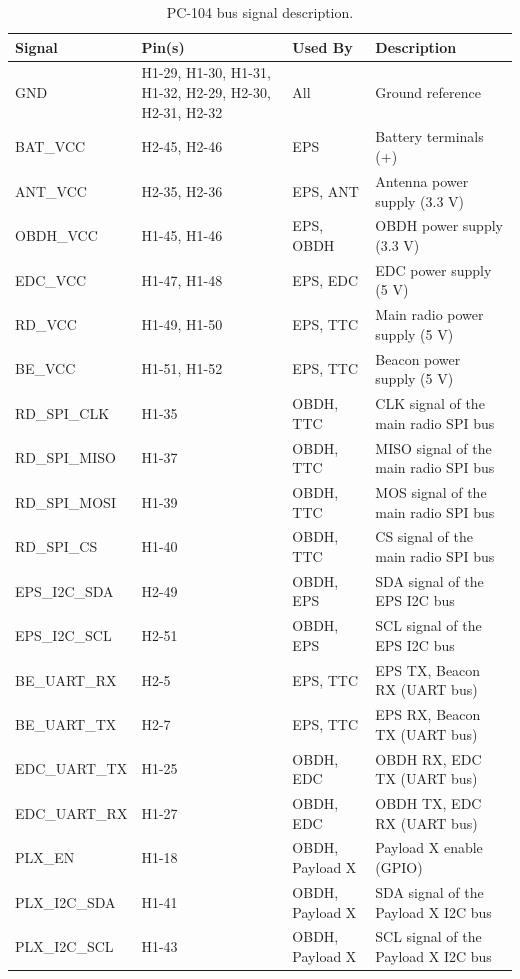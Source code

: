 \begin{table}[!h]
    \centering
    \begin{tabular}{lL{0.2\textwidth}L{0.15\textwidth}L{0.35\textwidth}}
        \toprule[1.5pt]
        \textbf{Signal} & \textbf{Pin(s)} & \textbf{Used By}     & \textbf{Description} \\
        \midrule
        GND             & H1-29, H1-30, H1-31, H1-32, H2-29, H2-30, H2-31, H2-32 & All                  & Ground reference \\
        BAT\_VCC        & H2-45, H2-46    & EPS                  & Battery terminals (+) \\
        ANT\_VCC        & H2-35, H2-36    & EPS, ANT             & Antenna power supply (3.3 V) \\
        OBDH\_VCC       & H1-45, H1-46    & EPS, OBDH            & OBDH power supply (3.3 V) \\
        EDC\_VCC        & H1-47, H1-48    & EPS, EDC             & EDC power supply (5 V) \\
        RD\_VCC         & H1-49, H1-50    & EPS, TTC             & Main radio power supply (5 V) \\
        BE\_VCC         & H1-51, H1-52    & EPS, TTC             & Beacon power supply (5 V) \\
        RD\_SPI\_CLK    & H1-35           & OBDH, TTC            & CLK signal of the main radio SPI bus \\
        RD\_SPI\_MISO   & H1-37           & OBDH, TTC            & MISO signal of the main radio SPI bus \\
        RD\_SPI\_MOSI   & H1-39           & OBDH, TTC            & MOS signal of the main radio SPI bus \\
        RD\_SPI\_CS     & H1-40           & OBDH, TTC            & CS signal of the main radio SPI bus \\
        EPS\_I2C\_SDA   & H2-49           & OBDH, EPS            & SDA signal of the EPS I2C bus \\
        EPS\_I2C\_SCL   & H2-51           & OBDH, EPS            & SCL signal of the EPS I2C bus \\
        BE\_UART\_RX    & H2-5            & EPS, TTC             & EPS TX, Beacon RX (UART bus) \\
        BE\_UART\_TX    & H2-7            & EPS, TTC             & EPS RX, Beacon TX (UART bus) \\
        EDC\_UART\_TX   & H1-25           & OBDH, EDC            & OBDH RX, EDC TX (UART bus) \\
        EDC\_UART\_RX   & H1-27           & OBDH, EDC            & OBDH TX, EDC RX (UART bus) \\
        PLX\_EN         & H1-18           & OBDH, Payload X      & Payload X enable (GPIO) \\
        PLX\_I2C\_SDA   & H1-41           & OBDH, Payload X      & SDA signal of the Payload X I2C bus \\
        PLX\_I2C\_SCL   & H1-43           & OBDH, Payload X      & SCL signal of the Payload X I2C bus \\
        \bottomrule[1.5pt]
    \end{tabular}
    \caption{PC-104 bus signal description.}
    \label{tab:pc104-signals}
\end{table}
